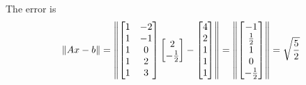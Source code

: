 \documentclass{article}
\begin{document}
\begin{example}
      The error is \[
        \norm{Ax - b} = \norm{
          \begin{bmatrix}
            1 & -2\\
            1 & -1\\
            1 & 0\\
            1 & 2\\
            1 & 3\\
          \end{bmatrix}
          \begin{bmatrix}
            2\\-\frac{1}{2}\\
          \end{bmatrix} -
          \begin{bmatrix}
            4\\2\\1\\1\\1\\
        \end{bmatrix}} = \norm{
          \begin{bmatrix}
            -1\\\frac{1}{2}\\1\\0\\-\frac{1}{2}\\
        \end{bmatrix}} = \sqrt{\frac{5}{2}}
      \]
    \end{example}
\end{document}
